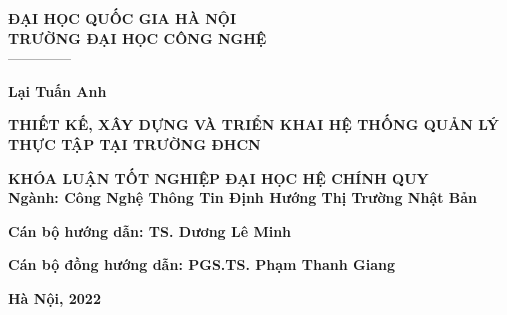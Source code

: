 \documentclass[./main.tex]{subfiles}
\begin{document}
\begin{titlepage}
	\begin{center}
		\textbf{ĐẠI HỌC QUỐC GIA HÀ NỘI}\\
		\textbf{TRƯỜNG ĐẠI HỌC CÔNG NGHỆ}\\
		--------------

		\vspace*{50pt}

		{\fontsize{12}{1.3} \textbf{Lại Tuấn Anh}}

		\vspace*{40pt}

		{\fontsize{18}{1.3} \textbf{\MakeUppercase{Thiết kế, xây dựng và triển khai hệ thống quản lý thực tập tại trường ĐHCN}}}
		\vspace*{50pt}

		{\fontsize{12}{1.3} \textbf{KHÓA LUẬN TỐT NGHIỆP ĐẠI HỌC HỆ CHÍNH QUY} \\
			\textbf{Ngành: Công Nghệ Thông Tin Định Hướng Thị Trường Nhật Bản}}

	\end{center}

	\vspace*{30pt}

	\begin{flushleft}
		\textbf{Cán bộ hướng dẫn: TS. Dương Lê Minh} \\

		\vspace*{70pt}

		\textbf{Cán bộ đồng hướng dẫn: PGS.TS. Phạm Thanh Giang}
	\end{flushleft}

	\vfill

	\begin{center}
		\textbf{Hà Nội, 2022}
	\end{center}
\end{titlepage}
\end{document}
